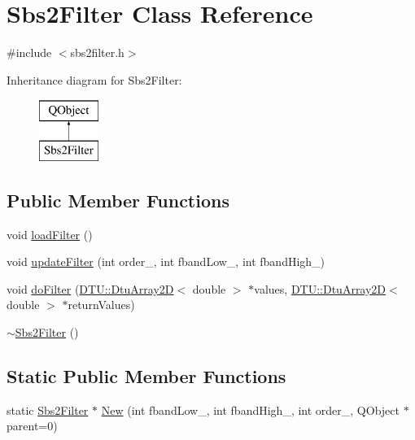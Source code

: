\hypertarget{classSbs2Filter}{\section{Sbs2\-Filter Class Reference}
\label{classSbs2Filter}
}


{\ttfamily \#include $<$sbs2filter.\-h$>$}

Inheritance diagram for Sbs2\-Filter\-:\begin{figure}[H]
\begin{center}
\leavevmode
\includegraphics[height=2.000000cm]{classSbs2Filter}
\end{center}
\end{figure}
\subsection*{Public Member Functions}
\begin{DoxyCompactItemize}
\item 
void \hyperlink{classSbs2Filter_a8558f399923de358f6d5f26b66316a9f}{load\-Filter} ()
\item 
void \hyperlink{classSbs2Filter_ad0b72e2a6993a3bddf04f4ad109f1f24}{update\-Filter} (int order\-\_\-, int fband\-Low\-\_\-, int fband\-High\-\_\-)
\item 
void \hyperlink{classSbs2Filter_aebd19b521ed3947f2b95880f84d15b32}{do\-Filter} (\hyperlink{classDTU_1_1DtuArray2D}{D\-T\-U\-::\-Dtu\-Array2\-D}$<$ double $>$ $\ast$values, \hyperlink{classDTU_1_1DtuArray2D}{D\-T\-U\-::\-Dtu\-Array2\-D}$<$ double $>$ $\ast$return\-Values)
\item 
\hyperlink{classSbs2Filter_a48d41a9be977d691a54dff195ef01f94}{$\sim$\-Sbs2\-Filter} ()
\end{DoxyCompactItemize}
\subsection*{Static Public Member Functions}
\begin{DoxyCompactItemize}
\item 
static \hyperlink{classSbs2Filter}{Sbs2\-Filter} $\ast$ \hyperlink{classSbs2Filter_a33d3f76111ff92d1fbbd12cb971e9926}{New} (int fband\-Low\-\_\-, int fband\-High\-\_\-, int order\-\_\-, Q\-Object $\ast$parent=0)
\end{DoxyCompactItemize}


